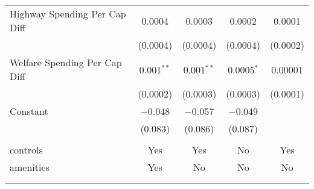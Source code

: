 \begin{table}[!htbp]
\begin{tabular}{@{\extracolsep{5pt}}lcccc}
  Highway Spending Per Cap Diff & 0.0004 & 0.0003 & 0.0002 & 0.0001 \\ 
  & (0.0004) & (0.0004) & (0.0004) & (0.0002) \\ 
  Welfare Spending Per Cap Diff & 0.001$^{**}$ & 0.001$^{**}$ & 0.0005$^{*}$ & 0.00001 \\ 
  & (0.0002) & (0.0003) & (0.0003) & (0.0001) \\ 
  Constant & $-$0.048 & $-$0.057 & $-$0.049 &  \\ 
  & (0.083) & (0.086) & (0.087) &  \\ 
 \hline \\[-1.8ex] 
controls & Yes & Yes & No & Yes \\ 
amenities & Yes & No & No & No \\ 
\hline \\[-1.8ex] 
\hline 
\hline \\[-1.8ex] 
\end{tabular} 
\end{table} 
